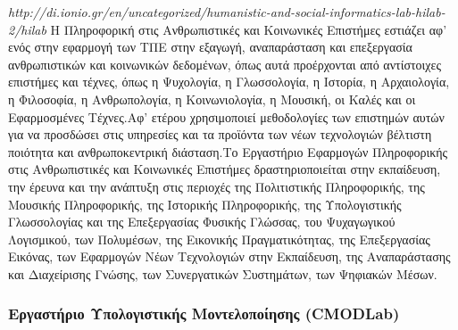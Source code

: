 \emph{http://di.ionio.gr/en/uncategorized/humanistic-and-social-informatics-lab-hilab-2/hilab}
Η Πληροφορική στις Ανθρωπιστικές και Κοινωνικές Επιστήμες εστιάζει αφ'
ενός στην εφαρμογή των ΤΠΕ στην εξαγωγή, αναπαράσταση και επεξεργασία
ανθρωπιστικών και κοινωνικών δεδομένων, όπως αυτά προέρχονται από
αντίστοιχες επιστήμες και τέχνες, όπως η Ψυχολογία, η Γλωσσολογία, η
Ιστορία, η Αρχαιολογία, η Φιλοσοφία, η Ανθρωπολογία, η Κοινωνιολογία, η
Μουσική, οι Καλές και οι Εφαρμοσμένες Τέχνες.Αφ' ετέρου χρησιμοποιεί
μεθοδολογίες των επιστημών αυτών για να προσδώσει στις υπηρεσίες και τα
προϊόντα των νέων τεχνολογιών βέλτιστη ποιότητα και ανθρωποκεντρική
διάσταση.Το Εργαστήριο Εφαρμογών Πληροφορικής στις Ανθρωπιστικές και
Κοινωνικές Επιστήμες δραστηριοποιείται στην εκπαίδευση, την έρευνα και
την ανάπτυξη στις περιοχές της Πολιτιστικής Πληροφορικής, της Μουσικής
Πληροφορικής, της Ιστορικής Πληροφορικής, της Υπολογιστικής Γλωσσολογίας
και της Επεξεργασίας Φυσικής Γλώσσας, του Ψυχαγωγικού Λογισμικού, των
Πολυμέσων, της Εικονικής Πραγματικότητας, της Επεξεργασίας Εικόνας, των
Εφαρμογών Νέων Τεχνολογιών στην Εκπαίδευση, της Αναπαράστασης και
Διαχείρισης Γνώσης, των Συνεργατικών Συστημάτων, των Ψηφιακών Μέσων.

\hypertarget{ux3b5ux3c1ux3b3ux3b1ux3c3ux3c4ux3aeux3c1ux3b9ux3bf-ux3c5ux3c0ux3bfux3bbux3bfux3b3ux3b9ux3c3ux3c4ux3b9ux3baux3aeux3c2-ux3bcux3bfux3bdux3c4ux3b5ux3bbux3bfux3c0ux3bfux3afux3b7ux3c3ux3b7ux3c2-cmodlab}{%
\subsubsection{Εργαστήριο Υπολογιστικής Μοντελοποίησης
(CMODLab)}\label{ux3b5ux3c1ux3b3ux3b1ux3c3ux3c4ux3aeux3c1ux3b9ux3bf-ux3c5ux3c0ux3bfux3bbux3bfux3b3ux3b9ux3c3ux3c4ux3b9ux3baux3aeux3c2-ux3bcux3bfux3bdux3c4ux3b5ux3bbux3bfux3c0ux3bfux3afux3b7ux3c3ux3b7ux3c2-cmodlab}}


